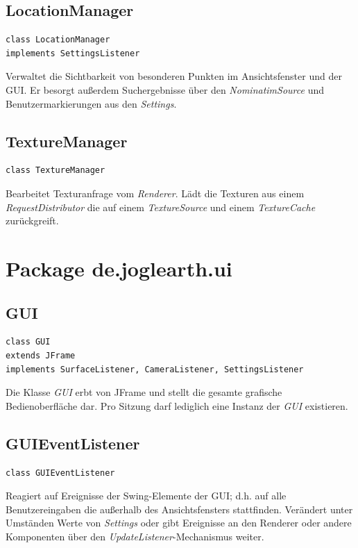 \documentclass[10pt]{scrreprt}
\begin{document}
\vspace{5mm}
\subsection*{LocationManager}
\begin{lstlisting}
class LocationManager
implements SettingsListener
\end{lstlisting}
Verwaltet die Sichtbarkeit von besonderen Punkten im Ansichtsfenster und der GUI. Er besorgt außerdem Suchergebnisse über den \textit{NominatimSource} und Benutzermarkierungen aus den \textit{Settings}.\\

\vspace{5mm}
\subsection*{TextureManager}
\begin{lstlisting}
class TextureManager
\end{lstlisting}
Bearbeitet Texturanfrage vom \textit{Renderer}. Lädt die Texturen aus einem \textit{RequestDistributor} die auf einem \textit{TextureSource} und einem \textit{TextureCache} zurückgreift.\\




\vspace{5mm}
\section{Package de.joglearth.ui}
\subsection*{GUI}
\begin{lstlisting}
class GUI
extends JFrame
implements SurfaceListener, CameraListener, SettingsListener
\end{lstlisting}
Die Klasse \textit{GUI} erbt von JFrame und stellt die gesamte grafische Bedienoberfläche dar. Pro Sitzung darf lediglich eine Instanz der \textit{GUI} existieren.\\

\vspace{5mm}
\subsection*{GUIEventListener}
\begin{lstlisting}
class GUIEventListener
\end{lstlisting}
Reagiert auf Ereignisse der Swing-Elemente der GUI; d.h. auf alle Benutzereingaben die außerhalb des Ansichtsfensters stattfinden. Verändert unter Umständen Werte von \textit{Settings} oder gibt Ereignisse an den Renderer oder andere Komponenten über den \textit{UpdateListener}-Mechanismus weiter.\\
\end{document}
